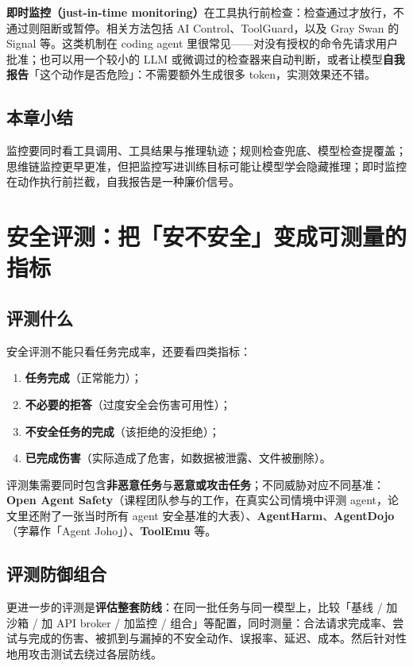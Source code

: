﻿\documentclass[a4paper]{article}
\begin{document}
\textbf{即时监控（just-in-time monitoring）}在工具执行前检查：检查通过才放行，不通过则阻断或暂停。相关方法包括 AI Control、ToolGuard，以及 Gray Swan 的 Signal 等。这类机制在 coding agent 里很常见——对没有授权的命令先请求用户批准；也可以用一个较小的 LLM 或微调过的检查器来自动判断，或者让模型\textbf{自我报告}「这个动作是否危险」：不需要额外生成很多 token，实测效果还不错。

\subsection{本章小结}
监控要同时看工具调用、工具结果与推理轨迹；规则检查兜底、模型检查提覆盖；思维链监控更早更准，但把监控写进训练目标可能让模型学会隐藏推理；即时监控在动作执行前拦截，自我报告是一种廉价信号。

\section{安全评测：把「安不安全」变成可测量的指标}

\subsection{评测什么}

安全评测不能只看任务完成率，还要看四类指标：

\begin{enumerate}
\item \textbf{任务完成}（正常能力）；
\item \textbf{不必要的拒答}（过度安全会伤害可用性）；
\item \textbf{不安全任务的完成}（该拒绝的没拒绝）；
\item \textbf{已完成伤害}（实际造成了危害，如数据被泄露、文件被删除）。
\end{enumerate}

评测集需要同时包含\textbf{非恶意任务}与\textbf{恶意或攻击任务}；不同威胁对应不同基准：\textbf{Open Agent Safety}（课程团队参与的工作，在真实公司情境中评测 agent，论文里还附了一张当时所有 agent 安全基准的大表）、\textbf{AgentHarm}、\textbf{AgentDojo}（字幕作「Agent Joho」）、\textbf{ToolEmu} 等。

\subsection{评测防御组合}

更进一步的评测是\textbf{评估整套防线}：在同一批任务与同一模型上，比较「基线 / 加沙箱 / 加 API broker / 加监控 / 组合」等配置，同时测量：合法请求完成率、尝试与完成的伤害、被抓到与漏掉的不安全动作、误报率、延迟、成本。然后针对性地用攻击测试去绕过各层防线。
\end{document}
